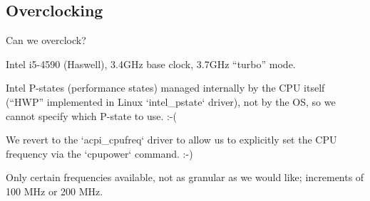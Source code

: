 \subsection{Overclocking}

Can we overclock?

Intel i5-4590 (Haswell), 3.4GHz base clock, 3.7GHz “turbo” mode.

Intel P-states (performance states) managed internally by the CPU itself (“HWP”
implemented in Linux `intel\_pstate` driver), not by the OS, so we cannot specify
which P-state to use. :-(

We revert to the `acpi\_cpufreq` driver to allow us to explicitly set the CPU
frequency via the `cpupower` command. :-)

Only certain frequencies available, not as granular as we would like; increments
of 100 MHz or 200 MHz.

